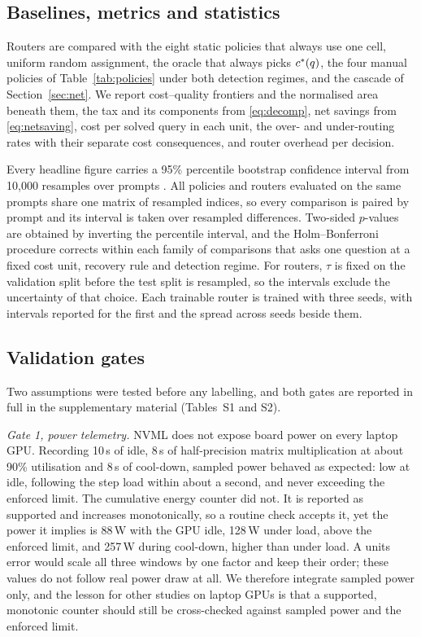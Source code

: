 \subsection{Baselines, metrics and statistics}
\label{sec:setup-stats}

Routers are compared with the eight static policies that always use one cell,
uniform random assignment, the oracle that always picks $c^{*}(q)$, the four
manual policies of Table~\ref{tab:policies} under both detection regimes, and
the cascade of Section~\ref{sec:net}. We report cost--quality frontiers and
the normalised area beneath them, the tax and its components from
\eqref{eq:decomp}, net savings from \eqref{eq:netsaving}, cost per solved
query in each unit, the over- and under-routing rates with their separate
cost consequences, and router overhead per decision.

Every headline figure carries a 95\% percentile bootstrap confidence interval
from 10{,}000 resamples over prompts \cite{efron1993bootstrap}. All policies
and routers evaluated on the same prompts share one matrix of resampled
indices, so every comparison is paired by prompt and its interval is taken
over resampled differences. Two-sided $p$-values are obtained by inverting
the percentile interval, and the Holm--Bonferroni procedure
\cite{holm1979simple} corrects within each family of comparisons that asks
one question at a fixed cost unit, recovery rule and detection regime. For
routers, $\tau$ is fixed on the validation split before the test split is
resampled, so the intervals exclude the uncertainty of that choice. Each
trainable router is trained with three seeds, with intervals reported for the
first and the spread across seeds beside them.

\subsection{Validation gates}
\label{sec:setup-gates}

Two assumptions were tested before any labelling, and both gates are reported
in full in the supplementary material (Tables~S1 and S2).

\emph{Gate 1, power telemetry.} NVML does not expose board power on every
laptop GPU. Recording 10\,s of idle, 8\,s of half-precision matrix
multiplication at about 90\% utilisation and 8\,s of cool-down, sampled power
behaved as expected: low at idle, following the step load within about a
second, and never exceeding the enforced limit. The cumulative energy counter
did not. It is reported as supported and increases monotonically, so a
routine check accepts it, yet the power it implies is 88\,W with the GPU
idle, 128\,W under load, above the enforced limit, and 257\,W during
cool-down, higher than under load. A units error would scale all three
windows by one factor and keep their order; these values do not follow real
power draw at all. We therefore integrate sampled power only, and the lesson
for other studies on laptop GPUs is that a supported, monotonic counter
should still be cross-checked against sampled power and the enforced limit.

